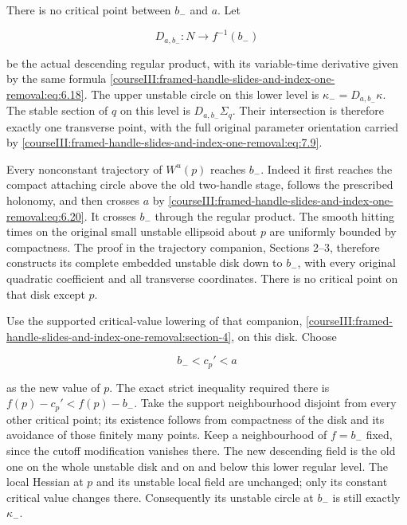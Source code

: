There is no critical point between \(b_-\) and \(a\). Let

\begin{equation}
D_{a,b_-}:N\longrightarrow f^{-1}(b_-)
 \label{courseIII:framed-handle-slides-and-index-one-removal:eq:7.9}
\end{equation}

be the actual descending regular product, with its variable-time derivative given by the same formula \eqref{courseIII:framed-handle-slides-and-index-one-removal:eq:6.18}. The upper unstable circle on this lower level is
\(\kappa_-=D_{a,b_-}\kappa\). The stable section of \(q\) on this level is \(D_{a,b_-}\Sigma_q\). Their intersection is therefore exactly one transverse point, with the full original parameter orientation carried by \eqref{courseIII:framed-handle-slides-and-index-one-removal:eq:7.9}.

Every nonconstant trajectory of \(W^u(p)\) reaches \(b_-\). Indeed it first reaches the compact attaching circle above the old two-handle stage, follows the prescribed holonomy, and then crosses \(a\) by \eqref{courseIII:framed-handle-slides-and-index-one-removal:eq:6.20}. It crosses \(b_-\) through the regular product. The smooth hitting times on the original small unstable ellipsoid about \(p\) are uniformly bounded by compactness. The proof in the trajectory companion, Sections 2--3, therefore constructs its complete embedded unstable disk down to \(b_-\), with every original quadratic coefficient and all transverse coordinates. There is no critical point on that disk except \(p\).

Use the supported critical-value lowering of that companion, \cref{courseIII:framed-handle-slides-and-index-one-removal:section-4}, on this disk. Choose

\begin{equation}
b_-<c_p'<a
 \label{courseIII:framed-handle-slides-and-index-one-removal:eq:7.10}
\end{equation}

as the new value of \(p\). The exact strict inequality required there is
\(f(p)-c_p'<f(p)-b_-\).
Take the support neighbourhood disjoint from every other critical point; its existence follows from compactness of the disk and its avoidance of those finitely many points. Keep a neighbourhood of \(f=b_-\) fixed, since the cutoff modification vanishes there. The new descending field is the old one on the whole unstable disk and on and below this lower regular level. The local Hessian at \(p\) and its unstable local field are unchanged; only its constant critical value changes there. Consequently its unstable circle at \(b_-\) is still exactly \(\kappa_-\).

